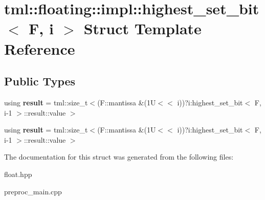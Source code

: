 \hypertarget{structtml_1_1floating_1_1impl_1_1highest__set__bit}{\section{tml\+:\+:floating\+:\+:impl\+:\+:highest\+\_\+set\+\_\+bit$<$ F, i $>$ Struct Template Reference}
\label{structtml_1_1floating_1_1impl_1_1highest__set__bit}
}
\subsection*{Public Types}
\begin{DoxyCompactItemize}
\item 
\hypertarget{structtml_1_1floating_1_1impl_1_1highest__set__bit_adc369c60e749638eb24094c9b2169634}{using {\bfseries result} = tml\+::size\+\_\+t$<$(F\+::mantissa \&(1\+U$<$$<$ i))?i\+:highest\+\_\+set\+\_\+bit$<$ F, i-\/1 $>$\+::result\+::value $>$}\label{structtml_1_1floating_1_1impl_1_1highest__set__bit_adc369c60e749638eb24094c9b2169634}

\item 
\hypertarget{structtml_1_1floating_1_1impl_1_1highest__set__bit_adc369c60e749638eb24094c9b2169634}{using {\bfseries result} = tml\+::size\+\_\+t$<$(F\+::mantissa \&(1\+U$<$$<$ i))?i\+:highest\+\_\+set\+\_\+bit$<$ F, i-\/1 $>$\+::result\+::value $>$}\label{structtml_1_1floating_1_1impl_1_1highest__set__bit_adc369c60e749638eb24094c9b2169634}

\end{DoxyCompactItemize}


The documentation for this struct was generated from the following files\+:\begin{DoxyCompactItemize}
\item 
float.\+hpp\item 
preproc\+\_\+main.\+cpp\end{DoxyCompactItemize}

